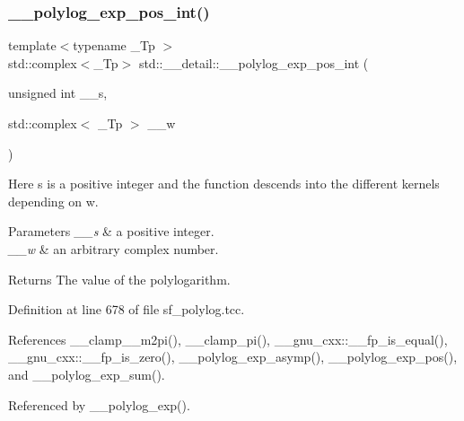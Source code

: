 \mbox{\label{namespacestd_1_1____detail_a84081b0dd494f4601f2d40768e71b7b4}} 
\subsubsection{\texorpdfstring{\+\_\+\+\_\+polylog\+\_\+exp\+\_\+pos\+\_\+int()}{\_\_polylog\_exp\_pos\_int()}\hspace{0.1cm}{\footnotesize\ttfamily [1/2]}}
{\footnotesize\ttfamily template$<$typename \+\_\+\+Tp $>$ \\
std\+::complex$<$\+\_\+\+Tp$>$ std\+::\+\_\+\+\_\+detail\+::\+\_\+\+\_\+polylog\+\_\+exp\+\_\+pos\+\_\+int (\begin{DoxyParamCaption}\item[{unsigned int}]{\+\_\+\+\_\+s,  }\item[{std\+::complex$<$ \+\_\+\+Tp $>$}]{\+\_\+\+\_\+w }\end{DoxyParamCaption})}

Here s is a positive integer and the function descends into the different kernels depending on w.


\begin{DoxyParams}{Parameters}
{\em \+\_\+\+\_\+s} & a positive integer. \\
\hline
{\em \+\_\+\+\_\+w} & an arbitrary complex number. \\
\hline
\end{DoxyParams}
\begin{DoxyReturn}{Returns}
The value of the polylogarithm. 
\end{DoxyReturn}


Definition at line 678 of file sf\+\_\+polylog.\+tcc.



References \+\_\+\+\_\+clamp\+\_\+\_\+m2pi(), \+\_\+\+\_\+clamp\+\_\+pi(), \+\_\+\+\_\+gnu\+\_\+cxx\+::\+\_\+\+\_\+fp\+\_\+is\+\_\+equal(), \+\_\+\+\_\+gnu\+\_\+cxx\+::\+\_\+\+\_\+fp\+\_\+is\+\_\+zero(), \+\_\+\+\_\+polylog\+\_\+exp\+\_\+asymp(), \+\_\+\+\_\+polylog\+\_\+exp\+\_\+pos(), and \+\_\+\+\_\+polylog\+\_\+exp\+\_\+sum().



Referenced by \+\_\+\+\_\+polylog\+\_\+exp().

